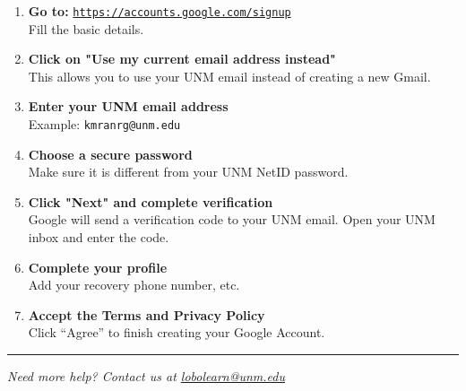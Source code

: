 \documentclass[12pt]{article}
\begin{document}
\begin{enumerate}[
    leftmargin=60pt,
    label=\textbf{Step \arabic*:},
    labelwidth=3em,
    labelsep=1em,
    align=left,
    itemsep=1.2em
]

    \item \textbf{Go to:} \href{https://accounts.google.com/signup/v2/webcreateaccount?flowName=GlifWebSignIn&flowEntry=SignUp}{\texttt{https://accounts.google.com/signup}} \\
    Fill the basic details.

    \item \textbf{Click on "Use my current email address instead"} \\
    This allows you to use your UNM email instead of creating a new Gmail.

    \item \textbf{Enter your UNM email address} \\
    Example: \texttt{kmranrg@unm.edu}

    \item \textbf{Choose a secure password} \\
    Make sure it is different from your UNM NetID password.

    \item \textbf{Click "Next" and complete verification} \\
    Google will send a verification code to your UNM email. Open your UNM inbox and enter the code.

    \item \textbf{Complete your profile} \\
    Add your recovery phone number, etc.

    \item \textbf{Accept the Terms and Privacy Policy} \\
    Click “Agree” to finish creating your Google Account.

\end{enumerate}

\vspace{0.5em}
\noindent\rule{\linewidth}{1pt}

\begin{center}
    \textit{Need more help? Contact us at \href{mailto:lobolearn@unm.edu}{lobolearn@unm.edu}}\\[0.5em]
\end{center}
\end{document}
